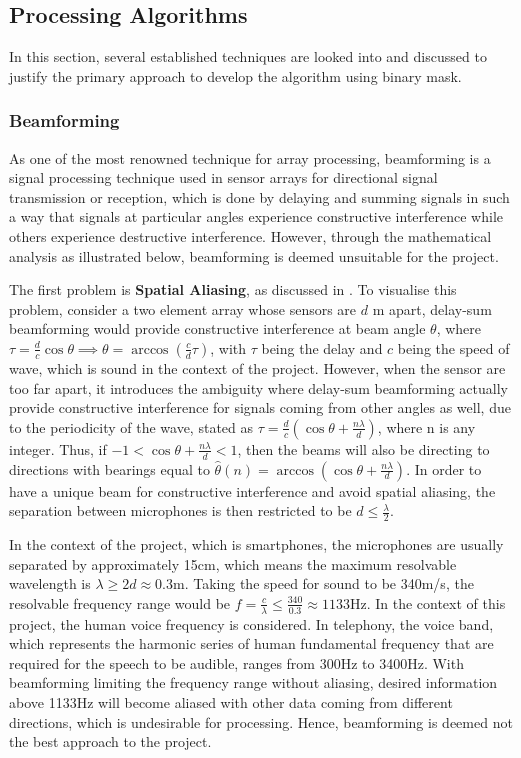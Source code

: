 \documentclass[a4paper,twoside,12pt,hidelinks]{article}
\begin{document}
\subsection{Processing Algorithms}
In this section, several established techniques are looked into and discussed to justify the primary approach to develop the algorithm using binary mask.
\subsubsection{Beamforming}
As one of the most renowned technique for array processing, beamforming is a signal processing technique used in sensor arrays for directional signal transmission or reception, which is done by delaying and summing signals in such a way that signals at particular angles experience constructive interference while others experience destructive interference. However, through the mathematical analysis as illustrated below, beamforming is deemed unsuitable for the project.

The first problem is \textbf{Spatial Aliasing}, as discussed in \cite{Hinich1978ProcessingAliased-arrays}. To visualise this problem, consider a two element array whose sensors are $d$ m apart, delay-sum beamforming would provide constructive interference at beam angle $\theta$, where $\tau = \frac{d}{c} \cos\theta \implies \theta = \arccos(\frac{c}{d}\tau)$, with $\tau$ being the delay and $c$ being the speed of wave, which is sound in the context of the project. However, when the sensor are too far apart, it introduces the ambiguity where delay-sum beamforming actually provide constructive interference for signals coming from other angles as well, due to the periodicity of the wave, stated as $\tau = \frac{d}{c}(\cos\theta +\frac{n\lambda}{d})$, where n is any integer.
Thus, if $-1<\cos\theta +\frac{n\lambda}{d}<1$, then the beams will also be directing to directions with bearings equal to $\hat{\theta}(n) = \arccos(\cos\theta +\frac{n\lambda}{d})$. In order to have a unique beam for constructive interference and avoid spatial aliasing, the separation between microphones is then restricted to be $d\leq\frac{\lambda}{2}$. 

In the context of the project, which is smartphones, the microphones are usually separated by approximately 15cm, which means the maximum resolvable wavelength is $\lambda \geq 2d \approx 0.3\text{m}$. Taking the speed for sound to be 340m/s, the resolvable frequency range would be $f=\frac{c}{\lambda}\leq\frac{340}{0.3}\approx 1133\text{Hz}$. In the context of this project, the human voice frequency is considered. In telephony, the voice band, which represents the harmonic series of human fundamental frequency that are required for the speech to be audible, ranges from 300Hz to 3400Hz.\cite{Freeman2005FundamentalsTelecommunications} With beamforming limiting the frequency range without aliasing, desired information above 1133Hz will become aliased with other data coming from different directions, which is undesirable for processing. Hence, beamforming is deemed not the best approach to the project.
\end{document}
